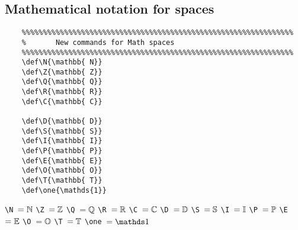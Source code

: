 \documentclass{article}
\begin{document}
\subsection{Mathematical notation for spaces}
\begin{minipage}[t]{0.78\textwidth}
    \begin{verbatim}
    %%%%%%%%%%%%%%%%%%%%%%%%%%%%%%%%%%%%%%%%%%%%%%%%%%%%%%%%%%%%%%%%
    %       New commands for Math spaces
    %%%%%%%%%%%%%%%%%%%%%%%%%%%%%%%%%%%%%%%%%%%%%%%%%%%%%%%%%%%%%%%%
    \def\N{\mathbb{ N}}
    \def\Z{\mathbb{ Z}}
    \def\Q{\mathbb{ Q}}
    \def\R{\mathbb{ R}}
    \def\C{\mathbb{ C}}
    
    \def\D{\mathbb{ D}}
    \def\S{\mathbb{ S}}
    \def\I{\mathbb{ I}}
    \def\P{\mathbb{ P}}
    \def\E{\mathbb{ E}}
    \def\O{\mathbb{ O}}
    \def\T{\mathbb{ T}}
    \def\one{\mathds{1}}
    \end{verbatim}
\end{minipage}
\begin{minipage}[t]{0.18\textwidth}
    \null\null\null
    \verb!\N !$=\N$\newline
    \verb!\Z !$=\Z$\newline
    \verb!\Q !$=\Q$\newline
    \verb!\R !$=\R$\newline
    \verb!\C !$=\C$\newline
    \null\newline
    \verb!\D !$=\D$\newline
    \verb!\S !$=\S$\newline
    \verb!\I !$=\I$\newline
    \verb!\P !$=\P$\newline
    \verb!\E !$=\E$\newline
    \verb!\O !$=\O$\newline
    \verb!\T !$=\T$\newline
    \verb!\one !$=\one$\newline
\end{minipage}
\end{document}
